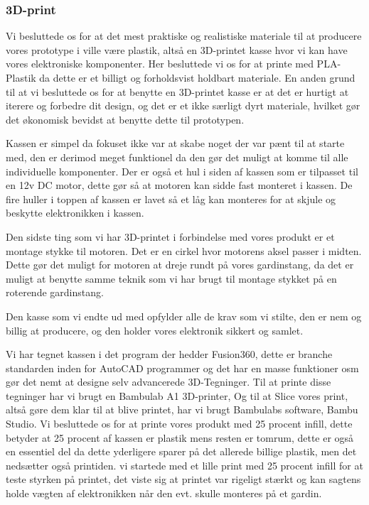 \documentclass[11pt]{article}
\begin{document}
\subsubsection{3D-print}
Vi besluttede os for at det mest praktiske og realistiske materiale til at producere vores prototype i ville være plastik, altså en 3D-printet kasse hvor vi kan have vores elektroniske komponenter. Her besluttede vi os for at printe med PLA-Plastik da dette er et billigt og forholdsvist holdbart materiale. En anden grund til at vi besluttede os for at benytte en 3D-printet kasse er at det er hurtigt at iterere og forbedre dit design, og det er et ikke særligt dyrt materiale, hvilket gør det økonomisk bevidst at benytte dette til prototypen.

Kassen er simpel da fokuset ikke var at skabe noget der var pænt til at starte med, den er derimod meget funktionel da den gør det muligt at komme til alle individuelle komponenter. Der er også et hul i siden af kassen som er tilpasset til en 12v DC motor, dette gør så at motoren kan sidde fast monteret i kassen. De fire huller i toppen af kassen er lavet så et låg kan monteres for at skjule og beskytte elektronikken i kassen.

Den sidste ting som vi har 3D-printet i forbindelse med vores produkt er et montage stykke til motoren. Det er en cirkel hvor motorens aksel passer i midten. Dette gør det muligt for motoren at dreje rundt på vores gardinstang, da det er muligt at benytte samme teknik som vi har brugt til montage stykket på en roterende gardinstang.

Den kasse som vi endte ud med opfylder alle de krav som vi stilte, den er nem og billig at producere, og den holder vores elektronik sikkert og samlet. 

Vi har tegnet kassen i det program der hedder Fusion360, dette er branche standarden inden for AutoCAD programmer og det har en masse funktioner osm gør det nemt at designe selv advancerede 3D-Tegninger. Til at printe disse tegninger har vi brugt en Bambulab A1 3D-printer, Og til at Slice vores print, altså gøre dem klar til at blive printet, har vi brugt Bambulabs software, Bambu Studio. Vi besluttede os for at printe vores produkt med 25 procent infill, dette betyder at 25 procent af kassen er plastik mens resten er tomrum, dette er også en essentiel del da dette yderligere sparer på det allerede billige plastik, men det nedsætter også printiden. vi startede med et lille print med 25 procent infill for at teste styrken på printet, det viste sig at printet var rigeligt stærkt og kan sagtens holde vægten af elektronikken når den evt. skulle monteres på et gardin. 
\end{document}
